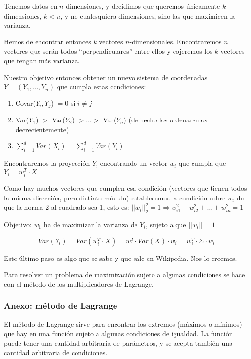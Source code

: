 Tenemos datos en $n$ dimensiones, y decidimos que queremos únicamente $k$ dimensiones, $k < n$, y no cualesquiera dimensiones, sino las que maximicen la varianza.

Hemos de encontrar entonces $k$ vectores $n$-dimensionales. Encontraremos $n$ vectores que serán todos ``perpendiculares'' entre ellos y cojeremos los $k$ vectores que tengan más varianza.

Nuestro objetivo entonces obtener un nuevo sistema de coordenadas $Y = (Y_1,\dots,Y_n)$ que cumpla estas condiciones:
\begin{enumerate}
  \item Covar($Y_i,Y_j$) $ = 0$ si $i \neq j$
  \item Var($Y_1$) $>$ Var($Y_2$) $> \dots > $ Var($Y_n$) (de hecho los ordenaremos decrecientemente)
  \item $\sum_{i = 1}^{d} Var(X_i) = \sum_{i = 1}^{d} Var(Y_i)$
\end{enumerate}

Encontraremos la proyección $Y_i$ encontrando un vector $w_i$ que cumpla que $Y_i = w_i^T \cdot X$

Como hay muchos vectores que cumplen esa condición (vectores que tienen todos la misma dirección, pero distinto módulo) establecemos la condición sobre $w_i$ de que la norma 2 al cuadrado sea 1, esto es: $||w_i||_2^2 = 1 \Rightarrow w_{i1}^2 + w_{i2}^2 + \dots + w_{in}^2 = 1$

Objetivo: $w_1$ ha de maximizar la varianza de $Y_i$, sujeto a que $||w_i|| = 1$

\begin{equation*}
  Var(Y_i) = Var(w_i^T \cdot X) = w_1^T \cdot Var(X) \cdot w_i = w_1^T \cdot \Sigma \cdot w_i
\end{equation*}

Este último paso es algo que se sabe y que sale en Wikipedia. Nos lo creemos.

Para resolver un problema de maximización sujeto a algunas condiciones se hace con el método de los multiplicadores de Lagrange.

\subsubsection*{Anexo: método de Lagrange}
El método de Lagrange sirve para encontrar los extremos (máximos o mínimos) que hay en una función sujeto a algunas condiciones de igualdad. La función puede tener una cantidad arbitraria de parámetros, y se acepta también una cantidad arbitraria de condiciones.

